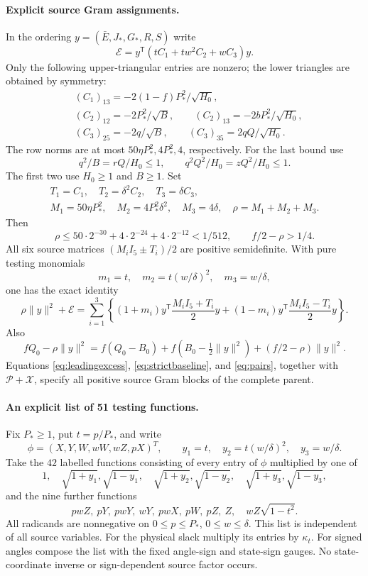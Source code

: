\documentclass[11pt]{article}
\begin{document}
\paragraph{Explicit source Gram assignments.}
In the ordering $y=(\bar E,J_*,G_*,R,S)$ write
\[
 \mathcal E=y^{\mathsf T}(tC_1+tw^2C_2+wC_3)y.
\]
Only the following upper-triangular entries are nonzero; the lower
triangles are obtained by symmetry:
\begin{align*}
 &(C_1)_{13}=-2(1-f)P_*^2/\sqrt{H_0},\\
 &(C_2)_{12}=-2P_*^2/\sqrt B,\qquad
   (C_2)_{13}=-2bP_*^2/\sqrt{H_0},\\
 &(C_3)_{25}=-2q/\sqrt B,\qquad
   (C_3)_{35}=2qQ/\sqrt{H_0}.
\end{align*}
The row norms are at most $50\eta P_*^2,4P_*^2,4$, respectively.
For the last bound use
\[
 q^2/B=rQ/H_0\le1,\qquad q^2Q^2/H_0=zQ^2/H_0\le1.
\]
The first two use $H_0\ge1$ and $B\ge1$.
Set
\begin{gather*}
 T_1=C_1,\quad T_2=\delta^2C_2,\quad T_3=\delta C_3,\\
 M_1=50\eta P_*^2,\quad M_2=4P_*^2\delta^2,\quad
 M_3=4\delta,\quad \rho=M_1+M_2+M_3.
\end{gather*}
Then
\[
 \rho\le50\cdot2^{-30}+4\cdot2^{-24}+4\cdot2^{-12}<1/512,
 \qquad f/2-\rho>1/4.
\]
All six source matrices $(M_iI_5\pm T_i)/2$ are positive
semidefinite. With pure testing monomials
\[
 m_1=t,\quad m_2=t(w/\delta)^2,\quad m_3=w/\delta,
\]
one has the exact identity
\begin{equation}\label{eq:pairs}
 \rho\|y\|^2+\mathcal E
 =\sum_{i=1}^3\left\{
 (1+m_i)y^{\mathsf T}\frac{M_iI_5+T_i}2y
 +(1-m_i)y^{\mathsf T}\frac{M_iI_5-T_i}2y\right\}.
\end{equation}
Also
\[
 fQ_0-\rho\|y\|^2
 =f(Q_0-B_0)+f(B_0-\tfrac12\|y\|^2)
                     +(f/2-\rho)\|y\|^2.
\]
Equations \eqref{eq:leadingexcess}, \eqref{eq:strictbaseline}, and
\eqref{eq:pairs}, together with $\mathcal P+\mathcal X$, specify all
positive source Gram blocks of the complete parent.

\paragraph{An explicit list of 51 testing functions.}
Fix $P_*\ge1$, put $t=p/P_*$, and write
\[
 \phi=(X,Y,W,wW,wZ,pX)^T,\qquad
 y_1=t,\quad y_2=t(w/\delta)^2,\quad y_3=w/\delta.
\]
Take the $42$ labelled functions consisting of every entry of $\phi$
multiplied by one of
\[
 1,\quad\sqrt{1+y_1},\sqrt{1-y_1},\quad
 \sqrt{1+y_2},\sqrt{1-y_2},\quad
 \sqrt{1+y_3},\sqrt{1-y_3},
\]
and the nine further functions
\[
 pwZ,\ pY,\ pwY,\ wY,\ pwX,\ pW,\ pZ,\ Z,
                         \quad wZ\sqrt{1-t^2}.
\]
All radicands are nonnegative on $0\le p\le P_*$,
$0\le w\le\delta$. This list is independent of all source variables.
For the physical slack multiply its entries by $\kappa_t$.
For signed angles compose the list with the fixed angle-sign and
state-sign gauges. No state-coordinate inverse or sign-dependent
source factor occurs.
\end{document}
